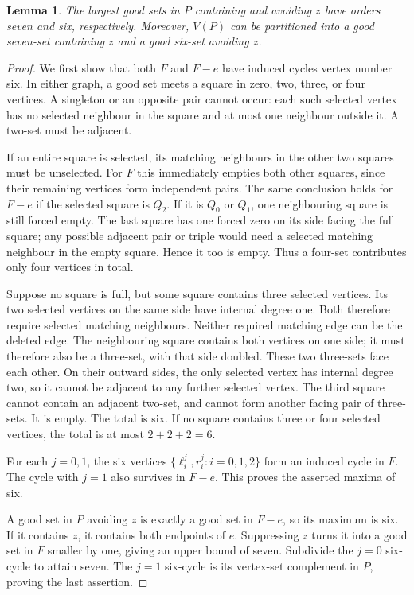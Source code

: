 \documentclass[11pt]{article}
\newtheorem{lemma}[theorem]{Lemma}
\begin{document}
\begin{lemma}\label{lem:cap}
The largest good sets in $P$ containing and avoiding $z$ have orders
seven and six, respectively. Moreover, $V(P)$ can be partitioned into
a good seven-set containing $z$ and a good six-set avoiding $z$.
\end{lemma}
\begin{proof}
We first show that both $F$ and $F-e$ have induced cycles vertex
number six. In either graph, a good set meets a square in zero, two,
three, or four vertices. A singleton or an opposite pair cannot occur:
each such selected vertex has no selected neighbour in the square
and at most one neighbour outside it. A two-set must be adjacent.

If an entire square is selected, its matching neighbours in the other
two squares must be unselected. For $F$ this immediately empties both
other squares, since their remaining vertices form independent pairs.
The same conclusion holds for $F-e$ if the selected square is $Q_2$.
If it is $Q_0$ or $Q_1$, one neighbouring square is still forced empty.
The last square has one forced zero on its side facing the full square;
any possible adjacent pair or triple would need a selected matching
neighbour in the empty square. Hence it too is empty. Thus a four-set
contributes only four vertices in total.

Suppose no square is full, but some square contains three selected
vertices. Its two selected vertices on the same side have internal
degree one. Both therefore require selected matching neighbours.
Neither required matching edge can be the deleted edge.
The neighbouring square contains both vertices on one side; it must
therefore also be a three-set, with that side doubled. These two
three-sets face each other. On their outward sides, the only selected
vertex has internal degree two, so it cannot be adjacent to any further
selected vertex. The third square cannot contain an adjacent two-set,
and cannot form another facing pair of three-sets. It is empty.
The total is six. If no square contains three or four selected
vertices, the total is at most $2+2+2=6$.

For each $j=0,1$, the six vertices
$\{\ell_i^j,r_i^j:i=0,1,2\}$ form an induced cycle in $F$.
The cycle with $j=1$ also survives in $F-e$. This proves the asserted
maxima of six.

A good set in $P$ avoiding $z$ is exactly a good set in $F-e$, so its
maximum is six. If it contains $z$, it contains both endpoints of $e$.
Suppressing $z$ turns it into a good set in $F$ smaller by one, giving
an upper bound of seven. Subdivide the $j=0$ six-cycle to attain seven.
The $j=1$ six-cycle is its vertex-set complement in $P$, proving the
last assertion.
\end{proof}
\end{document}
